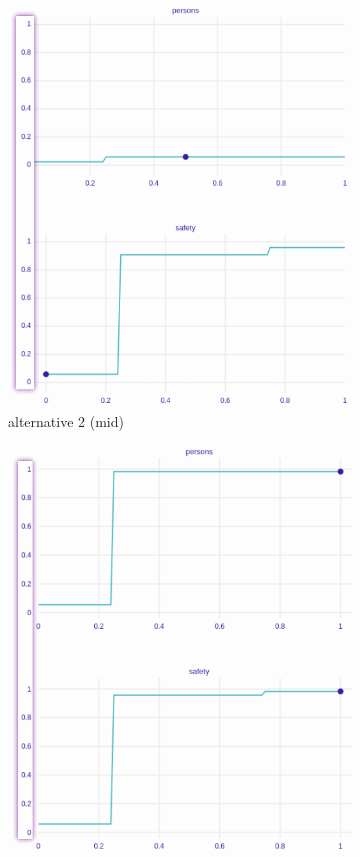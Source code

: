 \documentclass[../main.tex]{subfiles}
\begin{document}
\begin{figure}[H]
\begin{subfigure}[b]{0.32\linewidth}
		\includegraphics[width=\linewidth]{../img/xgb-cetpar-mid.png}
		\caption{alternative 2 (mid)}
		\label{fig:xgb-3alt1-cetpar}
	\end{subfigure}
	\begin{subfigure}[b]{0.32\linewidth}
		\includegraphics[width=\linewidth]{../img/xgb-cetpar-best.png}

\end{subfigure}
\end{figure}
\end{document}
